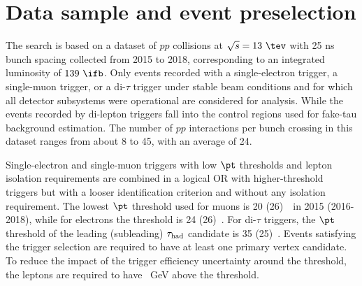 \section{Data sample and event preselection}
\label{sec:data_presel}

The search is based on a dataset of $pp$ collisions at $\sqrt{s}=13~\tev$ with 25 ns bunch spacing collected from 2015 to 2018, corresponding to an integrated luminosity of $139~\ifb$.
Only events recorded with a single-electron trigger, a single-muon trigger, or a di-$\tau$ trigger under stable beam conditions 
and for which all detector subsystems were operational are considered for analysis. While the events recorded by di-lepton triggers fall into the control regions used for fake-tau background estimation.
The number of $pp$ interactions per bunch crossing in this dataset ranges from about 8 to 45, with an average of 24.

Single-electron and single-muon triggers with low $\pt$ thresholds and lepton isolation requirements are combined in a logical OR 
with higher-threshold triggers but with a looser identification criterion and without any isolation requirement.
The lowest $\pt$ threshold used for muons is 20 (26)~\gev\ in 2015 (2016-2018), while for electrons the threshold is 24 (26)~\gev.
For di-$\tau$ triggers, the $\pt$ threshold of the leading (subleading) $\tau_{\mathrm{had}}$ candidate is 35 (25)~\gev.
Events satisfying the trigger selection are required to have at least one primary vertex candidate.
To reduce the impact of the trigger efficiency uncertainty around the threshold, the leptons are required to have ~GeV above the threshold. 

